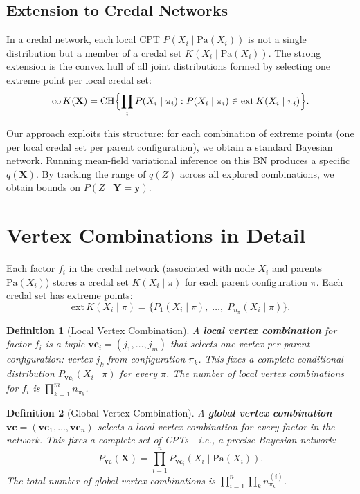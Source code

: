 \documentclass[11pt]{article}
\newtheorem{definition}{Definition}
\begin{document}
\subsection{Extension to Credal Networks}

In a credal network, each local CPT $P(X_i \mid \mathrm{Pa}(X_i))$ is not a single
distribution but a member of a credal set $K(X_i \mid \mathrm{Pa}(X_i))$.
The strong extension is the convex hull of all joint distributions formed by selecting
one extreme point per local credal set:
\begin{equation}\label{eq:strong-ext}
  \mathrm{co}\,K(\mathbf{X}) = \mathrm{CH}\Bigl\{
    \prod_{i} P(X_i \mid \pi_i) : P(X_i \mid \pi_i) \in \mathrm{ext}\,K(X_i \mid \pi_i)
  \Bigr\}.
\end{equation}

Our approach exploits this structure: for each combination of extreme points (one per
local credal set per parent configuration), we obtain a standard Bayesian network.
Running mean-field variational inference on this BN produces a specific $q(\mathbf{X})$.
By tracking the range of $q(Z)$ across all explored combinations, we obtain bounds
on $P(Z \mid \mathbf{Y} = \mathbf{y})$.

\section{Vertex Combinations in Detail}\label{sec:vc}

Each factor $f_i$ in the credal network (associated with node $X_i$ and parents
$\mathrm{Pa}(X_i)$) stores a credal set $K(X_i \mid \pi)$ for each parent
configuration $\pi$. Each credal set has extreme points:
\[
  \mathrm{ext}\,K(X_i \mid \pi) = \{P_1(X_i \mid \pi),\; \dots,\; P_{n_\pi}(X_i \mid \pi)\}.
\]

\begin{definition}[Local Vertex Combination]
A \textbf{local vertex combination} for factor $f_i$ is a tuple
$\mathbf{vc}_i = (j_1, \dots, j_m)$ that selects one vertex per parent configuration:
vertex $j_k$ from configuration $\pi_k$. This fixes a complete conditional distribution
$P_{\mathbf{vc}_i}(X_i \mid \pi)$ for every $\pi$.
The number of local vertex combinations for $f_i$ is $\prod_{k=1}^{m} n_{\pi_k}$.
\end{definition}

\begin{definition}[Global Vertex Combination]
A \textbf{global vertex combination} $\mathbf{vc} = (\mathbf{vc}_1, \dots, \mathbf{vc}_n)$
selects a local vertex combination for every factor in the network. This fixes a
complete set of CPTs---i.e., a \emph{precise Bayesian network}:
\[
  P_{\mathbf{vc}}(\mathbf{X}) = \prod_{i=1}^{n} P_{\mathbf{vc}_i}(X_i \mid \mathrm{Pa}(X_i)).
\]
The total number of global vertex combinations is $\prod_{i=1}^{n} \prod_{k} n_{\pi_k}^{(i)}$.
\end{definition}
\end{document}
